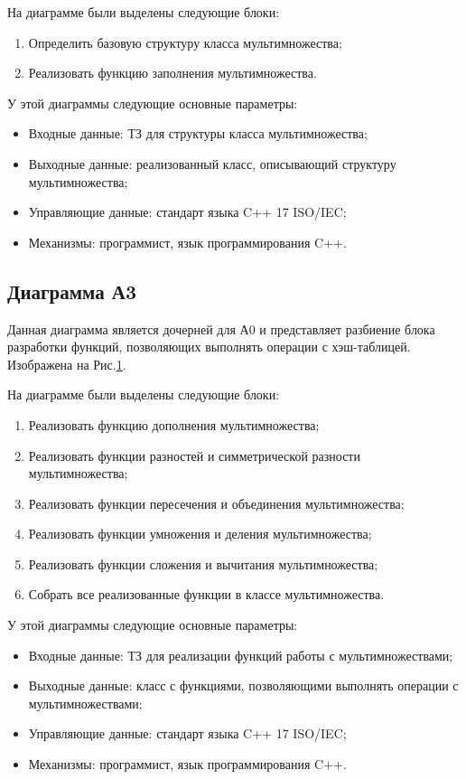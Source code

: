 \documentclass[a4paper, final]{article}
\begin{document}
\par На диаграмме были выделены следующие блоки:
\begin{enumerate}
\item Определить базовую структуру класса мультимножества;
\item Реализовать функцию заполнения мультимножества.
\end{enumerate}
У этой диаграммы следующие основные параметры:
\begin{itemize}
\item Входные данные: ТЗ для структуры класса мультимножества;
\item Выходные данные: реализованный класс, описывающий структуру мультимножества;
\item Управляющие данные: стандарт языка C++ 17 ISO/IEC;
\item Механизмы: программист, язык программирования C++.
\end{itemize}


\newpage
\subsection{Диаграмма А3}
\par Данная диаграмма является дочерней для А0 и представляет разбиение блока разработки функций, позволяющих выполнять операции с хэш-таблицей. Изображена на Рис.\ref{fig4:Диаграмма А3}. 

\begin{figure}[H]
	\centering
	
	\label{fig4:Диаграмма А3}
\end{figure}


\par На диаграмме были выделены следующие блоки:
\begin{enumerate}
\item Реализовать функцию дополнения мультимножества;
\item Реализовать функции разностей и симметрической разности мультимножества;
\item Реализовать функции пересечения и объединения мультимножества;
\item Реализовать функции умножения и деления мультимножества;
\item Реализовать функции сложения и вычитания мультимножества;
\item Собрать все реализованные функции в классе мультимножества.
\end{enumerate}
У этой диаграммы следующие основные параметры:
\begin{itemize}
\item Входные данные: ТЗ для реализации функций работы с мультимножествами;
\item Выходные данные: класс с функциями, позволяющими выполнять операции с мультимножествами;
\item Управляющие данные: стандарт языка C++ 17 ISO/IEC;
\item Механизмы: программист, язык программирования C++.
\end{itemize}
\end{document}
